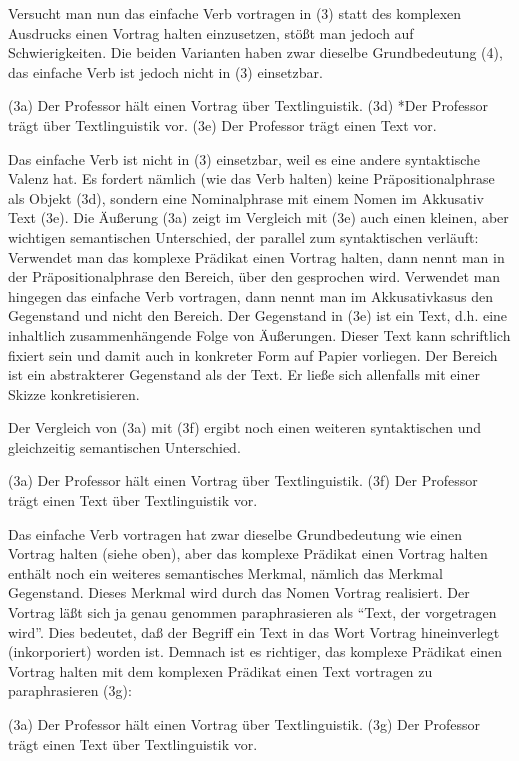 \documentclass[
]{article}
\begin{document}
Versucht man nun das einfache Verb vortragen in (3) statt des komplexen Ausdrucks einen Vortrag halten einzusetzen, stößt man jedoch auf Schwierigkeiten. Die beiden Varianten haben zwar dieselbe Grundbedeutung (4), das einfache Verb ist jedoch nicht in (3) einsetzbar.

(3a) Der Professor hält einen Vortrag über Textlinguistik.
(3d) *Der Professor trägt über Textlinguistik vor.
(3e) Der Professor trägt einen Text vor.

Das einfache Verb ist nicht in (3) einsetzbar, weil es eine andere syntaktische Valenz hat. Es fordert nämlich (wie das Verb halten) keine Präpositionalphrase als Objekt (3d), sondern eine Nominalphrase mit einem Nomen im Akkusativ Text (3e). Die Äußerung (3a) zeigt im Vergleich mit (3e) auch einen kleinen, aber wichtigen semantischen Unterschied, der parallel zum syntaktischen verläuft: Verwendet man das komplexe Prädikat einen Vortrag halten, dann nennt man in der Präpositionalphrase den Bereich, über den gesprochen wird. Verwendet man hingegen das einfache Verb vortragen, dann nennt man im Akkusativkasus den Gegenstand und nicht den Bereich. Der Gegenstand in (3e) ist ein Text, d.h. eine inhaltlich zusammenhängende Folge von Äußerungen. Dieser Text kann schriftlich fixiert sein und damit auch in konkreter Form auf Papier vorliegen. Der Bereich ist ein abstrakterer Gegenstand als der Text. Er ließe sich allenfalls mit einer Skizze konkretisieren.

Der Vergleich von (3a) mit (3f) ergibt noch einen weiteren syntaktischen und gleichzeitig semantischen Unterschied.

(3a) Der Professor hält einen Vortrag über Textlinguistik.
(3f) Der Professor trägt einen Text über Textlinguistik vor.

Das einfache Verb vortragen hat zwar dieselbe Grundbedeutung wie einen Vortrag halten (siehe oben), aber das komplexe Prädikat einen Vortrag halten enthält noch ein weiteres semantisches Merkmal, nämlich das Merkmal Gegenstand. Dieses Merkmal wird durch das Nomen Vortrag realisiert. Der Vortrag läßt sich ja genau genommen paraphrasieren als ``Text, der vorgetragen wird''. Dies bedeutet, daß der Begriff ein Text in das Wort Vortrag hineinverlegt (inkorporiert) worden ist. Demnach ist es richtiger, das komplexe Prädikat einen Vortrag halten mit dem komplexen Prädikat einen Text vortragen zu paraphrasieren (3g):

(3a) Der Professor hält einen Vortrag über Textlinguistik.
(3g) Der Professor trägt einen Text über Textlinguistik vor.
\end{document}
